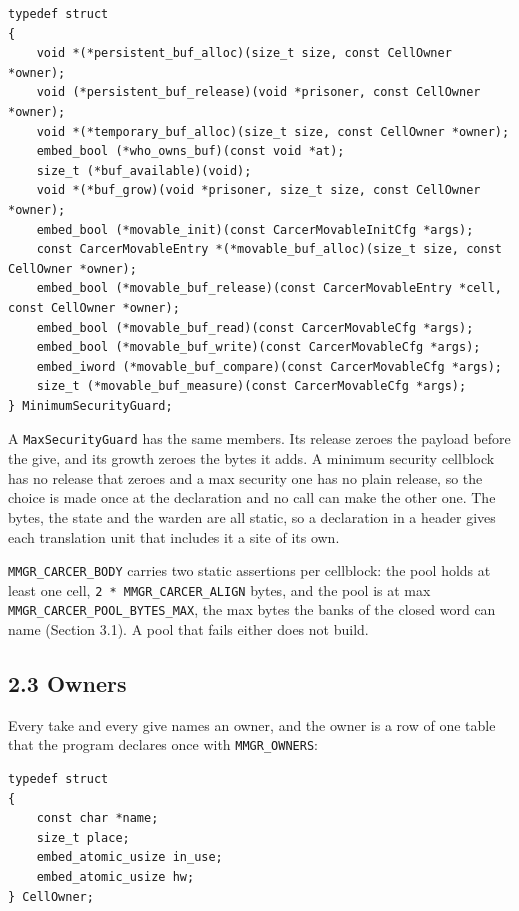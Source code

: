 \begin{Verbatim}
typedef struct
{
    void *(*persistent_buf_alloc)(size_t size, const CellOwner *owner);
    void (*persistent_buf_release)(void *prisoner, const CellOwner *owner);
    void *(*temporary_buf_alloc)(size_t size, const CellOwner *owner);
    embed_bool (*who_owns_buf)(const void *at);
    size_t (*buf_available)(void);
    void *(*buf_grow)(void *prisoner, size_t size, const CellOwner *owner);
    embed_bool (*movable_init)(const CarcerMovableInitCfg *args);
    const CarcerMovableEntry *(*movable_buf_alloc)(size_t size, const CellOwner *owner);
    embed_bool (*movable_buf_release)(const CarcerMovableEntry *cell, const CellOwner *owner);
    embed_bool (*movable_buf_read)(const CarcerMovableCfg *args);
    embed_bool (*movable_buf_write)(const CarcerMovableCfg *args);
    embed_iword (*movable_buf_compare)(const CarcerMovableCfg *args);
    size_t (*movable_buf_measure)(const CarcerMovableCfg *args);
} MinimumSecurityGuard;
\end{Verbatim}

A \texttt{Max\allowbreak{}Security\allowbreak{}Guard} has the same members. Its release zeroes the payload before the give, and its growth zeroes the bytes it adds. A minimum security cellblock has no release that zeroes and a max security one has no plain release, so the choice is made once at the declaration and no call can make the other one. The bytes, the state and the warden are all static, so a declaration in a header gives each translation unit that includes it a site of its own.

\texttt{MMGR\_\allowbreak{}CARCER\_\allowbreak{}BODY} carries two static assertions per cellblock: the pool holds at least one cell, \texttt{2 * MMGR\_\allowbreak{}CARCER\_\allowbreak{}ALIGN} bytes, and the pool is at max \texttt{MMGR\_\allowbreak{}CARCER\_\allowbreak{}POOL\_\allowbreak{}BYTES\_\allowbreak{}MAX}, the max bytes the banks of the closed word can name (Section 3.1). A pool that fails either does not build.

\subsection{\texorpdfstring{2.3 Owners}{2.3 Owners}}

Every take and every give names an owner, and the owner is a row of one table that the program declares once with \texttt{MMGR\_\allowbreak{}OWNERS}:

\begin{Verbatim}
typedef struct
{
    const char *name;
    size_t place;
    embed_atomic_usize in_use;
    embed_atomic_usize hw;
} CellOwner;
\end{Verbatim}

